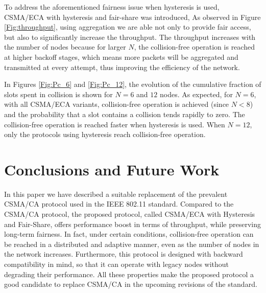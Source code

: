 \documentclass[conference]{IEEEtran}
\newcommand{\Az}[1]{{\color{black}{#1}}}
\begin{document}
To address the aforementioned fairness issue when hysteresis is used, CSMA/ECA with hysteresis and fair-share was introduced, \Az{whereby stations that access the channel less frequently use packet aggregation to send more (precisely, $2^s$) packets per attempt.} As observed in Figure \ref{Fig:throughput}, using aggregation we are able not only to provide fair access, but also to significantly increase the throughput. {The throughput increases with the number of nodes because for larger $N$, the collision-free operation is reached at higher backoff stages, which means more packets will be aggregated and transmitted at every attempt, thus improving the efficiency of the network.}


In Figures \ref{Fig:Pc_6} and \ref{Fig:Pc_12}, the evolution of the cumulative fraction of slots spent in collision is shown for $N = 6$ and $12$ nodes. As expected, for $N=6$, with all CSMA/ECA variants, collision-free operation is achieved (since $N<8$) and the probability that a slot contains a collision tends rapidly to zero. The collision-free operation is reached faster when hysteresis is used. When $N=12$, only the protocols using hysteresis reach collision-free operation.


\section{Conclusions and Future Work}
\label{sec:future_work}

In this paper we have described a suitable replacement of the prevalent CSMA/CA protocol used in the IEEE 802.11 standard. Compared to the CSMA/CA protocol, the proposed protocol, called CSMA/ECA with Hysteresis and Fair-Share, offers performance boost in terms of throughput, while preserving long-term fairness. In fact, under certain conditions, collision-free operation can be reached in a distributed and adaptive manner, even as the number of nodes in the network increases. Furthermore, this protocol is designed with backward compatibility in mind, so that it can operate with legacy nodes without degrading their performance. All these properties make the proposed protocol a good candidate to replace CSMA/CA in the upcoming revisions of the standard.
\end{document}
